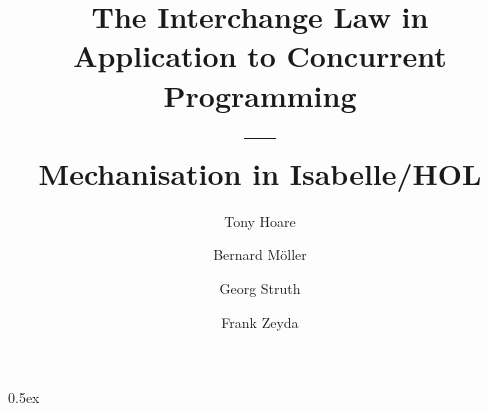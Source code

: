 \documentclass[11pt,a4paper]{article}
\begin{document}
\title{The Interchange Law in Application to Concurrent Programming\\---\\Mechanisation in Isabelle/HOL}

\author{Tony Hoare \and Bernard M\"{o}ller \and Georg Struth \and Frank Zeyda}



\maketitle


\begin{abstract}
\end{abstract}


\tableofcontents
\newpage

\parindent 0pt\parskip 0.5ex




\newpage


\newpage


\newpage


\newpage


\newpage


\newpage


\newpage




%
%

\end{document}
